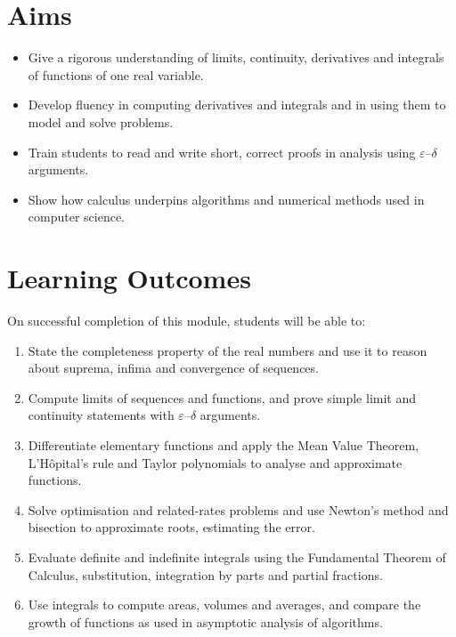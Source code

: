 \documentclass[11pt,a4paper]{article}
\begin{document}
\section{Aims}
\begin{itemize}
  \item Give a rigorous understanding of limits, continuity, derivatives and integrals of functions of one real variable.
  \item Develop fluency in computing derivatives and integrals and in using them to model and solve problems.
  \item Train students to read and write short, correct proofs in analysis using $\varepsilon$--$\delta$ arguments.
  \item Show how calculus underpins algorithms and numerical methods used in computer science.
\end{itemize}

\section{Learning Outcomes}
On successful completion of this module, students will be able to:
\begin{enumerate}[label=LO\arabic*.]
  \item State the completeness property of the real numbers and use it to reason about suprema, infima and convergence of sequences.
  \item Compute limits of sequences and functions, and prove simple limit and continuity statements with $\varepsilon$--$\delta$ arguments.
  \item Differentiate elementary functions and apply the Mean Value Theorem, L'H\^opital's rule and Taylor polynomials to analyse and approximate functions.
  \item Solve optimisation and related-rates problems and use Newton's method and bisection to approximate roots, estimating the error.
  \item Evaluate definite and indefinite integrals using the Fundamental Theorem of Calculus, substitution, integration by parts and partial fractions.
  \item Use integrals to compute areas, volumes and averages, and compare the growth of functions as used in asymptotic analysis of algorithms.
\end{enumerate}
\end{document}
